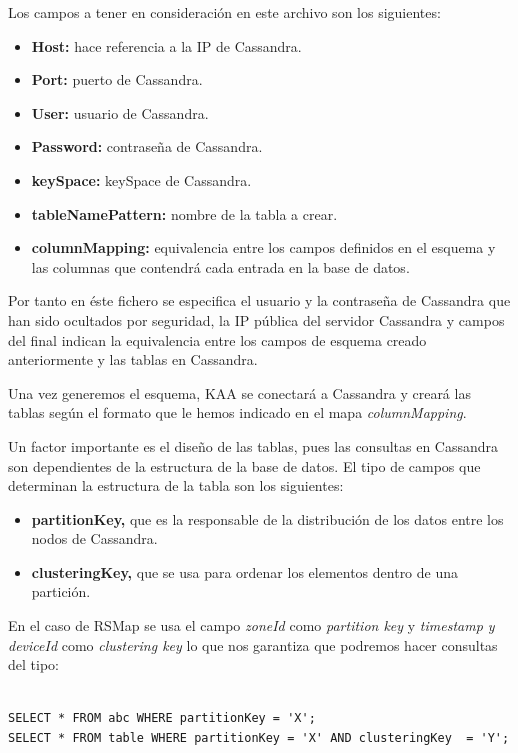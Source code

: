 Los campos a tener en consideración en este archivo son los siguientes:

\begin{itemize}
	\item \textbf{Host:} hace referencia a la IP de Cassandra.
	\item \textbf{Port:} puerto de Cassandra.
	\item \textbf{User:} usuario de Cassandra.
	\item \textbf{Password:} contraseña de Cassandra.
	\item \textbf{keySpace:} keySpace de Cassandra.
	\item \textbf{tableNamePattern:} nombre de la tabla a crear.
	\item \textbf{columnMapping:} equivalencia entre los campos definidos en el esquema y las columnas que contendrá cada entrada en la base de datos.
\end{itemize}


Por tanto en éste fichero se especifica el usuario y la contraseña de Cassandra que han sido ocultados por seguridad, la IP pública del servidor Cassandra y campos del final indican la equivalencia entre los campos de esquema creado anteriormente y las tablas en Cassandra.

Una vez generemos el esquema, KAA se conectará a Cassandra y creará las tablas según el formato que le hemos indicado en el mapa \textit{columnMapping}.

\bigskip

Un factor importante es el diseño de las tablas, pues las consultas en Cassandra son dependientes de la estructura de la base de datos. El tipo de campos que determinan la estructura de la tabla son los siguientes:

\begin{itemize}
\item \textbf{partitionKey, } que es la responsable de la distribución de los datos entre los nodos de Cassandra.
\item \textbf{clusteringKey, } que se usa para ordenar los elementos dentro de una partición.
\end{itemize}

En el caso de RSMap se usa el campo \textit{zoneId} como \textit{partition key} y \textit{timestamp y deviceId} como \textit{clustering key} lo que nos garantiza que podremos hacer consultas del tipo:


\begin{lstlisting}[language=cql,caption={Mécanica de consultas en CQL según la estructura de tablas},label={lst:json_personal}]

SELECT * FROM abc WHERE partitionKey = 'X';
SELECT * FROM table WHERE partitionKey = 'X' AND clusteringKey  = 'Y';

\end{lstlisting}

